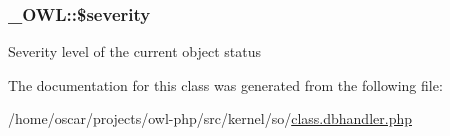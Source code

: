 \subsubsection[{\$severity}]{\setlength{\rightskip}{0pt plus 5cm}\_\-OWL::\$severity}\label{class__OWL_ad26b40a9dbbacb33e299b17826f8327c}
Severity level of the current object status 

The documentation for this class was generated from the following file:\begin{DoxyCompactItemize}
\item 
/home/oscar/projects/owl-\/php/src/kernel/so/\hyperlink{class_8dbhandler_8php}{class.dbhandler.php}\end{DoxyCompactItemize}
